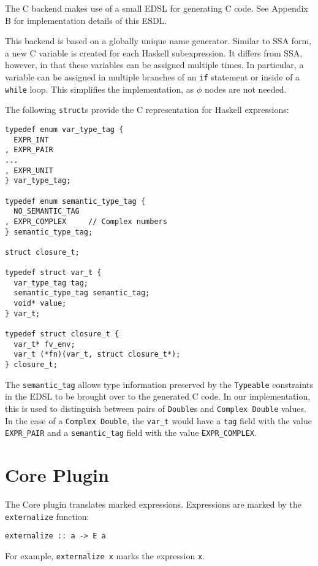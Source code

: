 \documentclass[sigplan,anonymous,review]{acmart}
\newcommand{\ttt}{\texttt}
\begin{document}
The C backend makes use of a small EDSL for generating C code. See
Appendix B for implementation details of this ESDL.

This backend is based on a globally unique name generator. Similar to
SSA form, a new C variable is created for each Haskell subexpression.
It differs from SSA, however, in that these variables can be assigned multiple
times. In particular, a variable can be assigned in multiple branches of
an \ttt{if} statement or inside of a \ttt{while} loop. This simplifies
the implementation, as $\phi$ nodes are not needed.

The following \ttt{struct}s provide the C representation for Haskell expressions:

\begin{lstlisting}
typedef enum var_type_tag {
  EXPR_INT
, EXPR_PAIR
...
, EXPR_UNIT
} var_type_tag;

typedef enum semantic_type_tag {
  NO_SEMANTIC_TAG
, EXPR_COMPLEX     // Complex numbers
} semantic_type_tag;

struct closure_t;

typedef struct var_t {
  var_type_tag tag;
  semantic_type_tag semantic_tag;
  void* value;
} var_t;

typedef struct closure_t {
  var_t* fv_env;
  var_t (*fn)(var_t, struct closure_t*);
} closure_t;
\end{lstlisting}

The \ttt{semantic\_tag} allows type information preserved by the \ttt{Typeable} constraints
in the EDSL to be brought over to the generated C code. In our implementation, this is
used to distinguish between pairs of \ttt{Double}s and \ttt{Complex Double} values. In the
case of a \ttt{Complex Double}, the \ttt{var\_t} would have a \ttt{tag} field with the value
\ttt{EXPR\_PAIR} and a \ttt{semantic\_tag} field with the value \ttt{EXPR\_COMPLEX}.

\section{Core Plugin}

The Core plugin translates marked expressions. Expressions are marked by
the \ttt{externalize} function:

\begin{lstlisting}
externalize :: a -> E a
\end{lstlisting}

For example, \ttt{externalize x} marks the expression \ttt{x}.
\end{document}
